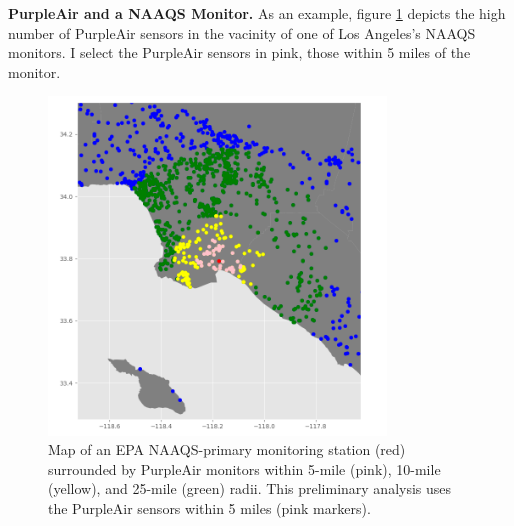 \documentclass[12pt]{article}
\begin{document}
\FloatBarrier
\textbf{PurpleAir and a NAAQS Monitor.} As an example, figure \ref{fig:concentric_purpleair_037-4004} depicts the high number of PurpleAir sensors in the vacinity of one of Los Angeles's NAAQS monitors. I select the PurpleAir sensors in pink, those within 5 miles of the monitor.
\begin{figure}[ht]
\centering
\includegraphics[width=0.8\textwidth]{county-037_site-4004_epa-pa-concentric-ranges.png}
\caption{Map of an EPA NAAQS-primary monitoring station (red) surrounded by PurpleAir monitors within 5-mile (pink), 10-mile (yellow), and 25-mile (green) radii. This preliminary analysis uses the PurpleAir sensors within 5 miles (pink markers).}
\label{fig:concentric_purpleair_037-4004}
\end{figure}

\end{document}
